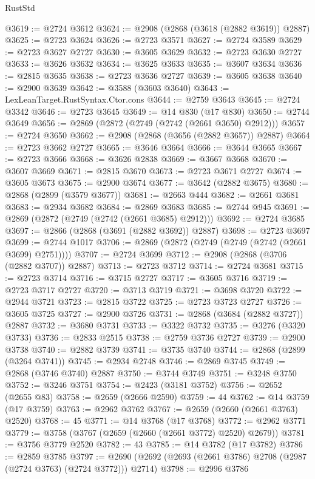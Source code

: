 \begin{lexlean}{RustStd}
\begin{coremodule}
{\begin{coremodule}
{{{{{{{{{{{{{{{{{{{{{{{{{{{{{{{{{{{{{{{@3619 := @2724 @3612
@3624 := @2908 (@2868 (@3618 (@2882 @3619)) @2887)
@3625 := @2723 @3624
@3626 := @2723 @3571
@3627 := @2724 @3589
@3629 := @2723 @3627 @2727
@3630 := @3605 @3629
@3632 := @2723 @3630 @2727
@3633 := @3626 @3632
@3634 := @3625 @3633
@3635 := @3607 @3634
@3636 := @2815 @3635
@3638 := @2723 @3636 @2727
@3639 := @3605 @3638
@3640 := @2900 @3639
@3642 := @3588 (@3603 @3640)
@3643 := LexLeanTarget.RustSyntax.Ctor.cons
@3644 := @2759 @3643
@3645 := @2724 @3342
@3646 := @2723 @3645
@3649 := @14 @830 (@17 @830)
@3650 := @2744 @3649
@3656 := @2869 (@2872 (@2749 (@2742 (@2661 @3650) @2912)))
@3657 := @2724 @3650
@3662 := @2908 (@2868 (@3656 (@2882 @3657)) @2887)
@3664 := @2723 @3662 @2727
@3665 := @3646 @3664
@3666 := @3644 @3665
@3667 := @2723 @3666
@3668 := @3626 @2838
@3669 := @3667 @3668
@3670 := @3607 @3669
@3671 := @2815 @3670
@3673 := @2723 @3671 @2727
@3674 := @3605 @3673
@3675 := @2900 @3674
@3677 := @3642 (@2882 @3675)
@3680 := @2868 (@2899 (@3579 @3677))
@3681 := @2663 @444
@3682 := @2661 @3681
@3683 := @2934 @3682
@3684 := @2869 @3683
@3685 := @2744 @945
@3691 := @2869 (@2872 (@2749 (@2742 (@2661 @3685) @2912)))
@3692 := @2724 @3685
@3697 := @2866 (@2868 (@3691 (@2882 @3692)) @2887)
@3698 := @2723 @3697
@3699 := @2744 @1017
@3706 := @2869 (@2872 (@2749 (@2749 (@2742 (@2661 @3699) @2751))))
@3707 := @2724 @3699
@3712 := @2908 (@2868 (@3706 (@2882 @3707)) @2887)
@3713 := @2723 @3712
@3714 := @2724 @3681
@3715 := @2723 @3714
@3716 := @3715 @2727
@3717 := @3605 @3716
@3719 := @2723 @3717 @2727
@3720 := @3713 @3719
@3721 := @3698 @3720
@3722 := @2944 @3721
@3723 := @2815 @3722
@3725 := @2723 @3723 @2727
@3726 := @3605 @3725
@3727 := @2900 @3726
@3731 := @2868 (@3684 (@2882 @3727)) @2887
@3732 := @3680 @3731
@3733 := @3322 @3732
@3735 := @3276 (@3320 @3733)
@3736 := @2833 @2515
@3738 := @2759 @3736 @2727
@3739 := @2900 @3738
@3740 := @2882 @3739
@3741 := @3735 @3740
@3744 := @2868 (@2899 (@3264 @3741))
@3745 := @2934 @2748
@3746 := @2869 @3745
@3749 := @2868 (@3746 @3740) @2887
@3750 := @3744 @3749
@3751 := @3248 @3750
@3752 := @3246 @3751
@3754 := @2423 (@3181 @3752)
@3756 := @2652 (@2655 @83)
@3758 := @2659 (@2666 @2590)
@3759 := 44
@3762 := @14 @3759 (@17 @3759)
@3763 := @2962 @3762
@3767 := @2659 (@2660 (@2661 @3763) @2520)
@3768 := 45
@3771 := @14 @3768 (@17 @3768)
@3772 := @2962 @3771
@3779 := @3758 (@3767 (@2659 (@2660 (@2661 @3772) @2520) @2679))
@3781 := @3756 @3779 @2520
@3782 := 43
@3785 := @14 @3782 (@17 @3782)
@3786 := @2859 @3785
@3797 := @2690 (@2692 (@2693 (@2661 @3786) @2708 (@2987 (@2724 @3763) (@2724 @3772))) @2714)
@3798 := @2996 @3786
}}}}}}}}}}}}}}}}}}}}}}}}}}}}}}}}}}}}}}}
\end{coremodule}}
\end{coremodule}
\end{lexlean}
